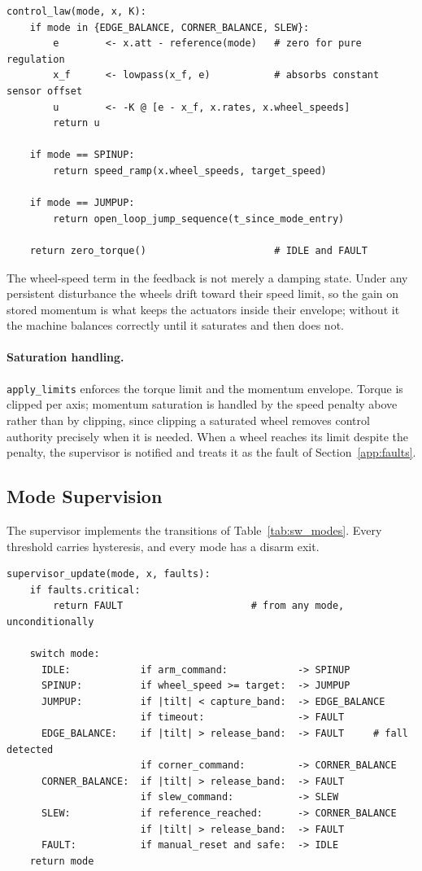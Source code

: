 \begin{verbatim}
control_law(mode, x, K):
    if mode in {EDGE_BALANCE, CORNER_BALANCE, SLEW}:
        e        <- x.att - reference(mode)   # zero for pure regulation
        x_f      <- lowpass(x_f, e)           # absorbs constant sensor offset
        u        <- -K @ [e - x_f, x.rates, x.wheel_speeds]
        return u

    if mode == SPINUP:
        return speed_ramp(x.wheel_speeds, target_speed)

    if mode == JUMPUP:
        return open_loop_jump_sequence(t_since_mode_entry)

    return zero_torque()                      # IDLE and FAULT
\end{verbatim}

The wheel-speed term in the feedback is not merely a damping state. Under any
persistent disturbance the wheels drift toward their speed limit, so the gain on
stored momentum is what keeps the actuators inside their envelope; without it
the machine balances correctly until it saturates and then does not.

\paragraph{Saturation handling.} \texttt{apply\_limits} enforces the torque
limit and the momentum envelope. Torque is clipped per axis; momentum saturation
is handled by the speed penalty above rather than by clipping, since clipping a
saturated wheel removes control authority precisely when it is needed. When a
wheel reaches its limit despite the penalty, the supervisor is notified and
treats it as the fault of Section~\ref{app:faults}.

\subsection{Mode Supervision}
\label{app:modes}

The supervisor implements the transitions of Table~\ref{tab:sw_modes}. Every
threshold carries hysteresis, and every mode has a disarm exit.

\begin{verbatim}
supervisor_update(mode, x, faults):
    if faults.critical:
        return FAULT                      # from any mode, unconditionally

    switch mode:
      IDLE:            if arm_command:            -> SPINUP
      SPINUP:          if wheel_speed >= target:  -> JUMPUP
      JUMPUP:          if |tilt| < capture_band:  -> EDGE_BALANCE
                       if timeout:                -> FAULT
      EDGE_BALANCE:    if |tilt| > release_band:  -> FAULT     # fall detected
                       if corner_command:         -> CORNER_BALANCE
      CORNER_BALANCE:  if |tilt| > release_band:  -> FAULT
                       if slew_command:           -> SLEW
      SLEW:            if reference_reached:      -> CORNER_BALANCE
                       if |tilt| > release_band:  -> FAULT
      FAULT:           if manual_reset and safe:  -> IDLE
    return mode
\end{verbatim}


